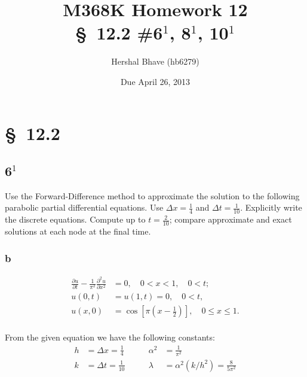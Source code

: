\documentclass[12pt]{article}
\title{M368K Homework 12 \\
  \normalsize{\S~12.2 \#6$^1$, 8$^1$, 10$^1$ }}
\author{Hershal Bhave (hb6279)}
\date{Due April 26, 2013}
\begin{document}
\maketitle

\section{\S~12.2}
\subsection{6$^1$}
\label{sec:6}
Use the Forward-Difference method to approximate the solution to the
following parabolic partial differential equations. Use $\Delta x =
\frac{1}{4}$ and $\Delta t = \frac{1}{10}$. Explicitly write the
discrete equations. Compute up to $t=\frac{2}{10}$; compare
approximate and exact solutions at each node at the final time.

\subsubsection{b}
\begin{equation}
\label{eq:6b_q}
\begin{aligned}
  \frac{\partial u}{\partial t} - \frac{1}{\pi^2}
  \frac{\partial^2u}{\partial x^2} &= 0,\quad 0<x<1,\quad 0<t;\\
  u(0,t) &= u(1,t)=0, \quad 0<t,\\
  u(x,0) &= \cos\left[\pi \left(x-\frac{1}{2}\right)\right], \quad
  0\leq x \leq 1.\\ 
\end{aligned}
\end{equation}

From the given equation we have the following constants:
\begin{equation}
  \label{eq:6b_const}
  \begin{aligned}
    h &= \Delta x = \frac{1}{4} \qquad&  \alpha^2 &= \frac{1}{\pi^2} \\
    k &= \Delta t = \frac{1}{10} \qquad& \lambda &= \alpha^2(k/h^2) = \frac{8}{5\pi^2} \\
  \end{aligned}
\end{equation}
\pagebreak[5]
\end{document}
